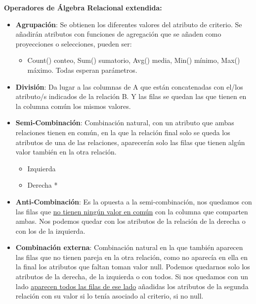 \documentclass[12pt, twoside, openright]{report} %
\begin{document}
  
  \textbf{Operadores de Álgebra Relacional extendida:}
  

  \begin{itemize}
  \item \textbf{Agrupación}: Se obtienen los diferentes valores del atributo
    de criterio. Se añadirán atributos con funciones de agregación que
    se añaden como proyecciones o selecciones, pueden ser:
    

    \begin{itemize}
    \item Count() conteo, Sum() sumatorio, Avg() media, Min() mínimo, Max()
      máximo. Todas esperan parámetros.
      
    \end{itemize}
  \item \textbf{División}: Da lugar a las columnas de A que están
    concatenadas con el/los atributo/s indicados de la relación B. Y las
    filas se quedan las que tienen en la columna común los mismos
    valores.
    
  \item \textbf{Semi-Combinación}: Combinación natural, con un atributo que
    ambas relaciones tienen en común, en la que la relación final solo
    se queda los atributos de una de las relaciones, aparecerán solo las
    filas que tienen algún valor también en la otra relación.
    

    \begin{itemize}
    \item Izquierda \textbar*
      
    \item Derecha *\textbar{}
      
    \end{itemize}
  \item \textbf{Anti-Combinación}: Es la opuesta a la semi-combinación, nos
    quedamos con las filas que \underline{no tienen ningún valor en
    común} con la columna que comparten ambas. Nos podemos quedar con
    los atributos de la relación de la derecha o con los de la
    izquierda.
    
  \item \textbf{Combinación externa}: Combinación natural en la que también
    aparecen las filas que no tienen pareja en la otra relación, como no
    aparecía en ella en la final los atributos que faltan toman valor
    null. Podemos quedarnos solo los atributos de la derecha, de la
    izquierda o con todos. Si nos quedamos con un lado
    \underline{aparecen todos las filas de ese lado} añadidas los
    atributos de la segunda relación con su valor si lo tenía asociado
    al criterio, si no null.
    

\end{itemize}
\end{document}

